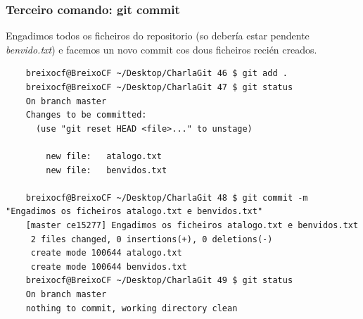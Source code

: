 \begin{frame}[fragile]
  \frametitle{Terceiro comando: git commit}
  \scriptsize
  Engadimos todos os ficheiros do repositorio (so debería estar pendente \textit{benvido.txt}) e facemos un novo commit cos dous ficheiros recién creados.
  \tiny 
\begin{verbatim}
	breixocf@BreixoCF ~/Desktop/CharlaGit 46 $ git add .
	breixocf@BreixoCF ~/Desktop/CharlaGit 47 $ git status
	On branch master
	Changes to be committed:
	  (use "git reset HEAD <file>..." to unstage)
	
		new file:   atalogo.txt
		new file:   benvidos.txt
	
	breixocf@BreixoCF ~/Desktop/CharlaGit 48 $ git commit -m "Engadimos os ficheiros atalogo.txt e benvidos.txt"
	[master ce15277] Engadimos os ficheiros atalogo.txt e benvidos.txt
	 2 files changed, 0 insertions(+), 0 deletions(-)
	 create mode 100644 atalogo.txt
	 create mode 100644 benvidos.txt
	breixocf@BreixoCF ~/Desktop/CharlaGit 49 $ git status
	On branch master
	nothing to commit, working directory clean
	
\end{verbatim}
  \scriptsize 
\end{frame}


